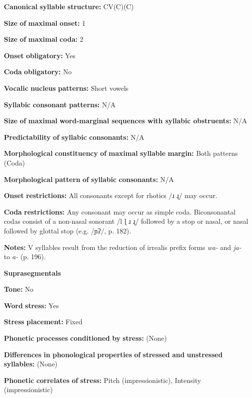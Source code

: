 \textbf{Canonical} \textbf{syllable} \textbf{structure:} CV(C)(C) \citep[186-96]{Merlan1989}

\textbf{Size} \textbf{of} \textbf{maximal} \textbf{onset:} 1

\textbf{Size} \textbf{of} \textbf{maximal} \textbf{coda:} 2

\textbf{Onset} \textbf{obligatory:} Yes

\textbf{Coda} \textbf{obligatory:} No

\textbf{Vocalic} \textbf{nucleus} \textbf{patterns:} Short vowels

\textbf{Syllabic} \textbf{consonant} \textbf{patterns:} N/A

\textbf{Size} \textbf{of} \textbf{maximal} \textbf{word{}-marginal sequences with syllabic obstruents:} N/A

\textbf{Predictability} \textbf{of} \textbf{syllabic} \textbf{consonants:} N/A

\textbf{Morphological} \textbf{constituency} \textbf{of} \textbf{maximal} \textbf{syllable} \textbf{margin:} Both patterns (Coda)

\textbf{Morphological} \textbf{pattern} \textbf{of} \textbf{syllabic} \textbf{consonants:} N/A

\textbf{Onset} \textbf{restrictions:} All consonants except for rhotics /ɹ ɻ/ may occur.

\textbf{Coda} \textbf{restrictions:} Any consonant may occur as simple coda. Biconsonantal codas consist of a non-nasal sonorant /l ɭ ɹ ɻ/ followed by a stop or nasal, or nasal followed by glottal stop (e.g. /ɲʔ/, p. 182).

\textbf{Notes:} V syllables result from the reduction of irrealis prefix forms \textit{wa-} and \textit{ja-} to \textit{a-} (p. 196).

\textbf{Suprasegmentals}

\textbf{Tone:} No

\textbf{Word} \textbf{stress:} Yes

\textbf{Stress} \textbf{placement:} Fixed

\textbf{Phonetic} \textbf{processes} \textbf{conditioned} \textbf{by} \textbf{stress:} (None)

\textbf{Differences} \textbf{in} \textbf{phonological} \textbf{properties} \textbf{of} \textbf{stressed} \textbf{and} \textbf{unstressed} \textbf{syllables:} (None)

\textbf{Phonetic} \textbf{correlates} \textbf{of} \textbf{stress:} Pitch (impressionistic), Intensity (impressionistic)

